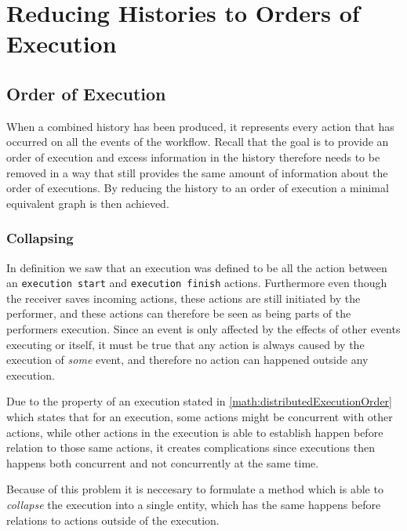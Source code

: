 \chapter{Reducing Histories to Orders of Execution}
\label{chap:order-of-execution}
\section{Order of Execution}
	When a combined history has been produced, it represents every action that has occurred on all the events of the workflow. 
	Recall that the goal is to provide an order of execution and excess information in the history therefore needs to be removed in a way that still provides the same amount of information about the order of executions. By reducing the history to an order of execution a minimal equivalent graph is then achieved.
	
	\subsection{Collapsing}
	In definition  we saw that an execution was defined to be all the action between an \texttt{execution start} and \texttt{execution finish} actions. Furthermore even though the receiver saves incoming actions, these actions are still initiated by the performer, and these actions can therefore be seen as being parts of the performers execution. Since an event is only affected by the effects of other events executing or itself, it must be true that any action is always caused by the execution of \textit{some} event, and therefore no action can happened outside any execution.
	
	
	\newpar 
	Due to the property of an execution stated in \ref{math:distributedExecutionOrder} which states that for an execution, some actions might be concurrent with other actions, while other actions in the execution is able to establish happen before relation to those same actions, it creates complications since executions then happens both concurrent and not concurrently at the same time. 
	
	Because of this problem it is neccesary to formulate a method which is able to \textit{collapse} the execution into a single entity, which has the same happens before relations to actions outside of the execution.
	
